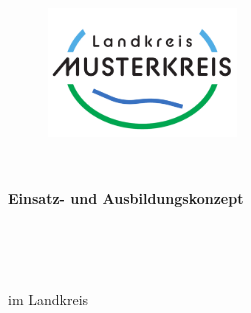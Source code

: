 \thispagestyle{plain}

\begin{figure}
  \centering
  \includegraphics[width=5cm]{images/logo_Landkreis.pdf}
\end{figure}
\,
\vspace{5\baselineskip}

\begin{center}
\begin{huge}\textbf{Einsatz- und Ausbildungskonzept}\end{huge}\\ 
\vspace{0.5\baselineskip}
\begin{huge}\textbf{\flq \specialistGroup{}\frq{}}\end{huge}\\
\vspace{1\baselineskip}
\begin{Large}im Landkreis \district\end{Large}
\vspace{3\baselineskip}
\end{center}


